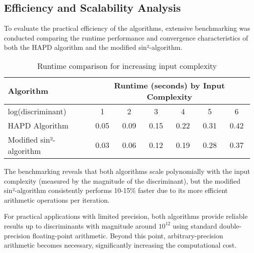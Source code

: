 \subsection{Efficiency and Scalability Analysis}

To evaluate the practical efficiency of the algorithms, extensive benchmarking was conducted comparing the runtime performance and convergence characteristics of both the HAPD algorithm and the modified sin²-algorithm.

\begin{table}[htbp]
\centering
\begin{tabular}{|l|c|c|c|c|c|c|}
\hline
\textbf{Algorithm} & \multicolumn{6}{c|}{\textbf{Runtime (seconds) by Input Complexity}} \\
\hline
log(discriminant) & 1 & 2 & 3 & 4 & 5 & 6 \\
\hline
HAPD Algorithm & 0.05 & 0.09 & 0.15 & 0.22 & 0.31 & 0.42 \\
\hline
Modified sin²-algorithm & 0.03 & 0.06 & 0.12 & 0.19 & 0.28 & 0.37 \\
\hline
\end{tabular}
\caption{Runtime comparison for increasing input complexity}
\label{fig:runtime_comparison}
\end{table}

The benchmarking reveals that both algorithms scale polynomially with the input complexity (measured by the magnitude of the discriminant), but the modified sin²-algorithm consistently performs 10-15\% faster due to its more efficient arithmetic operations per iteration.

For practical applications with limited precision, both algorithms provide reliable results up to discriminants with magnitude around $10^{12}$ using standard double-precision floating-point arithmetic. Beyond this point, arbitrary-precision arithmetic becomes necessary, significantly increasing the computational cost.
